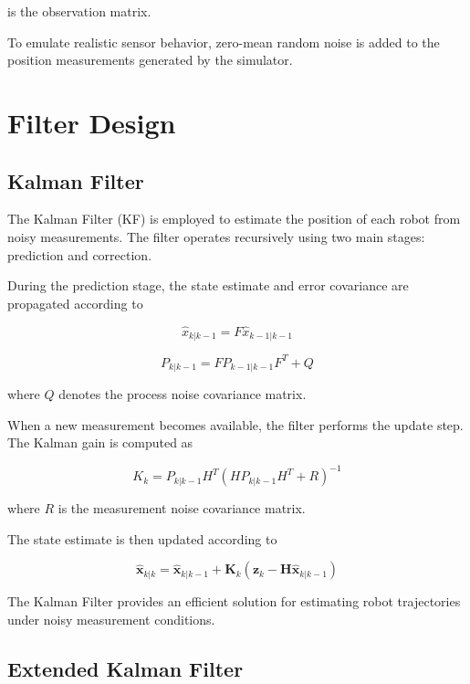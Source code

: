 \documentclass[conference]{IEEEtran}
\begin{document}
is the observation matrix.

To emulate realistic sensor behavior, zero-mean random noise is added to the position measurements generated by the simulator.

\section{Filter Design}

\subsection{Kalman Filter}

The Kalman Filter (KF) is employed to estimate the position of each robot from noisy measurements. The filter operates recursively using two main stages: prediction and correction.

During the prediction stage, the state estimate and error covariance are propagated according to

\begin{equation}
\hat{x}_{k|k-1}=F\hat{x}_{k-1|k-1}
\end{equation}

\begin{equation}
P_{k|k-1}=FP_{k-1|k-1}F^T+Q
\end{equation}

where \(Q\) denotes the process noise covariance matrix.

When a new measurement becomes available, the filter performs the update step. The Kalman gain is computed as

\begin{equation}
K_k=P_{k|k-1}H^T(HP_{k|k-1}H^T+R)^{-1}
\end{equation}

where \(R\) is the measurement noise covariance matrix.

The state estimate is then updated according to

\begin{equation}
\hat{\mathbf{x}}_{k|k}
=
\hat{\mathbf{x}}_{k|k-1}
+
\mathbf{K}_k
\left(
\mathbf{z}_k
-
\mathbf{H}
\hat{\mathbf{x}}_{k|k-1}
\right)
\end{equation}

The Kalman Filter provides an efficient solution for estimating robot trajectories under noisy measurement conditions.

\subsection{Extended Kalman Filter}
\end{document}
